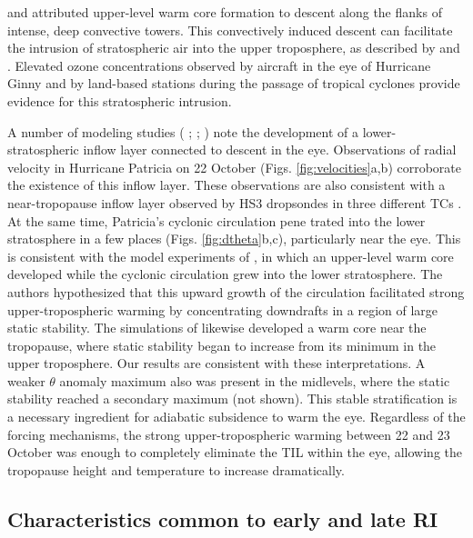 \cite{Guimondetal2010} and \cite{ChenZhang2013} attributed upper-level warm core formation to descent along the flanks of intense, deep convective towers.
This convectively induced descent can facilitate the intrusion of stratospheric air into the upper troposphere, as described by \cite{ZhangChen2012} and \cite{OhnoSatoh2015}.
Elevated ozone concentrations observed by aircraft in the eye of Hurricane Ginny \citep{Penn1965} and by land-based stations during the passage of tropical cyclones \citep{Dasetal2016} provide evidence for this stratospheric intrusion.

A number of modeling studies (\citeauthor{ZhangChen2012} \citeyear{ZhangChen2012}; \citeauthor{OhnoSatoh2015} \citeyear{OhnoSatoh2015}; \citeauthor{Kieuetal2016} \citeyear{Kieuetal2016}) note the development of a lower-stratospheric inflow layer connected to descent in the eye.
Observations of radial velocity in Hurricane Patricia on 22 October (Figs. \ref{fig:velocities}a,b) corroborate the existence of this inflow layer.
These observations are also consistent with a near-tropopause inflow layer observed by HS3 dropsondes in three different TCs \citep{KomaromiDoyle2017}.
At the same time, Patricia’s cyclonic circulation pene trated into the lower stratosphere in a few places (Figs. \ref{fig:dtheta}b,c), particularly near the eye.
This is consistent with the model experiments of \cite{OhnoSatoh2015}, in which an upper-level warm core developed while the cyclonic circulation grew into the lower stratosphere.
The authors hypothesized that this upward growth of the circulation facilitated strong upper-tropospheric warming by concentrating downdrafts in a region of large static stability.
The simulations of \cite{SternZhang2013} likewise developed a warm core near the tropopause, where static stability began to increase from its minimum in the upper troposphere.
Our results are consistent with these interpretations.
A weaker $\theta$ anomaly maximum also was present in the midlevels, where the static stability reached a secondary maximum (not shown).
This stable stratification is a necessary ingredient for adiabatic subsidence to warm
the eye.
Regardless of the forcing mechanisms, the strong upper-tropospheric warming between 22 and 23 October was enough to completely eliminate the TIL within the eye, allowing the tropopause height and temperature to increase dramatically.

\subsection{Characteristics common to early and late RI}

